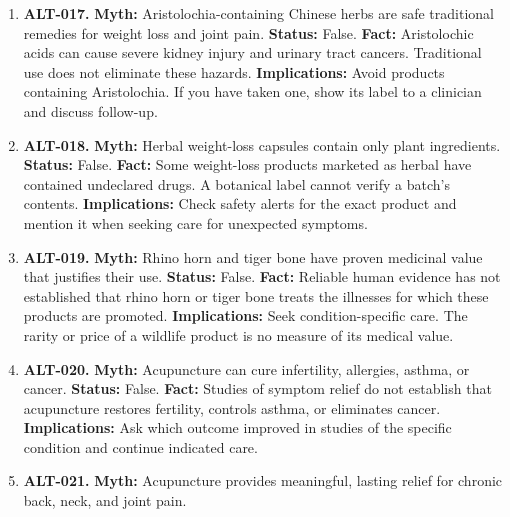 \documentclass[11pt,oneside]{book}
\begin{document}
\begin{enumerate}[leftmargin=0pt,labelwidth=0pt,labelsep=0pt,itemindent=0pt]
\item[] \textbf{ALT-017.} \textbf{Myth:} Aristolochia-containing Chinese herbs are safe traditional remedies for weight loss and joint pain.\newline
\textbf{Status:} False.\newline
\textbf{Fact:} Aristolochic acids can cause severe kidney injury and urinary tract cancers. Traditional use does not eliminate these hazards. \cite{ref119,ref120}\newline
\textbf{Implications:} Avoid products containing Aristolochia. If you have taken one, show its label to a clinician and discuss follow-up.
\item[] \textbf{ALT-018.} \textbf{Myth:} Herbal weight-loss capsules contain only plant ingredients.\newline
\textbf{Status:} False.\newline
\textbf{Fact:} Some weight-loss products marketed as herbal have contained undeclared drugs. A botanical label cannot verify a batch's contents. \cite{ref121}\newline
\textbf{Implications:} Check safety alerts for the exact product and mention it when seeking care for unexpected symptoms.
\item[] \textbf{ALT-019.} \textbf{Myth:} Rhino horn and tiger bone have proven medicinal value that justifies their use.\newline
\textbf{Status:} False.\newline
\textbf{Fact:} Reliable human evidence has not established that rhino horn or tiger bone treats the illnesses for which these products are promoted. \cite{ref122}\newline
\textbf{Implications:} Seek condition-specific care. The rarity or price of a wildlife product is no measure of its medical value.
\item[] \textbf{ALT-020.} \textbf{Myth:} Acupuncture can cure infertility, allergies, asthma, or cancer.\newline
\textbf{Status:} False.\newline
\textbf{Fact:} Studies of symptom relief do not establish that acupuncture restores fertility, controls asthma, or eliminates cancer. \cite{ref123,ref471}\newline
\textbf{Implications:} Ask which outcome improved in studies of the specific condition and continue indicated care.
\item[] \textbf{ALT-021.} \textbf{Myth:} Acupuncture provides meaningful, lasting relief for chronic back, neck, and joint pain.\newline

\end{enumerate}
\end{document}
